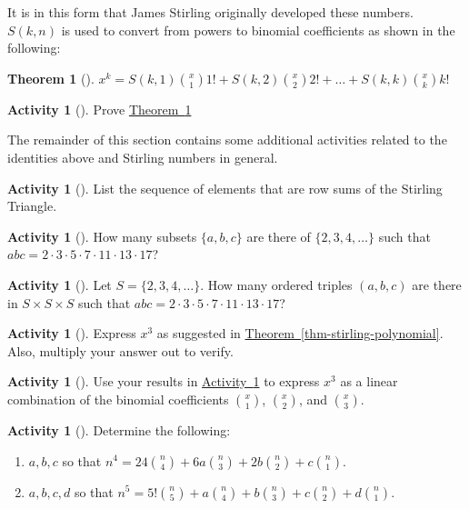 \documentclass[10pt,]{book}
\theoremstyle{plain}
\newtheorem{theorem}{Theorem}[section]
\theoremstyle{definition}
\theoremstyle{definition}
\theoremstyle{definition}
\newtheorem{activity}[project]{Activity}
\numberwithin{equation}{chapter}
\begin{document}
\hypertarget{p-1044}{}%
It is in this form that James Stirling originally developed these numbers. \(S(k,n)\) is used to convert from powers to binomial  coefficients as shown in the following:%
\begin{theorem}[{}]\label{thm-stirling-polynomial2}
\hypertarget{p-1045}{}%
\(x^{k} = S\left(k,1 \right)\binom{x}{1}1! + S\left(k,2 \right) \binom{x}{2}2! + \ldots + S\left(k,k \right)\binom{x}{k} k!\)%
\end{theorem}
\begin{activity}[]\label{activity-226}
\hypertarget{p-1046}{}%
Prove \hyperref[thm-stirling-polynomial2]{Theorem~\ref{thm-stirling-polynomial2}}%
\end{activity}
\hypertarget{p-1047}{}%
The remainder of this section contains some additional activities related to the identities above and Stirling numbers in general.%
\begin{activity}[]\label{activity-227}
\hypertarget{p-1048}{}%
List the sequence of elements that are row sums of the Stirling Triangle.%
\end{activity}
\begin{activity}[]\label{activity-228}
\hypertarget{p-1049}{}%
How many subsets \(\{a,b,c\}\) are there of \(\{2,3,4,\ldots\}\) such that \(abc = 2 \cdot 3 \cdot 5 \cdot 7 \cdot 11 \cdot 13 \cdot 17\)?%
\end{activity}
\begin{activity}[]\label{activity-229}
\hypertarget{p-1050}{}%
Let \(S = \{2,3,4,\ldots\}\).  How many ordered triples \((a,b,c)\) are there in \(S\times S \times S\) such that \(abc = 2 \cdot 3 \cdot 5 \cdot 7 \cdot 11 \cdot 13 \cdot 17\)?%
\end{activity}
\begin{activity}[]\label{ex-stirling-cubic}
\hypertarget{p-1051}{}%
Express \(x^3\) as suggested in \hyperref[thm-stirling-polynomial]{Theorem~\ref{thm-stirling-polynomial}}.  Also, multiply your answer out to verify.%
\end{activity}
\begin{activity}[]\label{activity-231}
\hypertarget{p-1052}{}%
Use your results in \hyperref[ex-stirling-cubic]{Activity~\ref{ex-stirling-cubic}} to express \(x^3\) as a linear combination of the binomial coefficients \(\binom{x}{1}\), \(\binom{x}{2}\), and \(\binom{x}{3}\).%
\end{activity}
\begin{activity}[]\label{activity-232}
\hypertarget{p-1053}{}%
Determine the following:%
\begin{enumerate}[font=\bfseries,label=(\alph*),ref=\alph*]
\item\label{task-192} \hypertarget{p-1054}{}%
\(a, b, c\) so that \(n^4 = 24\binom{n}{4} + 6a\binom{n}{3}+2b\binom{n}{2} + c \binom{n}{1}\).%
\item\label{task-193} \hypertarget{p-1055}{}%
\(a, b, c, d\) so that \(n^5 = 5!\binom{n}{5} + a\binom{n}{4} + b\binom{n}{3} + c \binom{n}{2} + d \binom{n}{1}\).%
\end{enumerate}
\end{activity}
\end{document}
